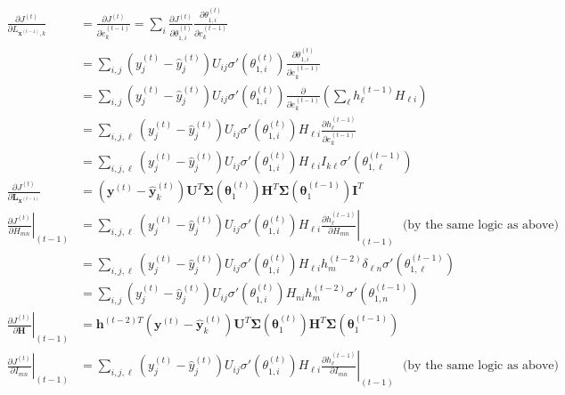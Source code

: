 \documentclass{article}
\begin{document}
\begin{itemize}
    \begin{align*}
        \frac{\partial J^{(t)}}{\partial L_{\mathbf{x}^{(t-1)}, k}} &= \frac{\partial J^{(t)}}{\partial e^{(t-1)}_k} = \sum_i \frac{\partial J^{(t)}}{\partial \theta_{1,i}^{(t)}} \frac{\partial \theta_{1,i}^{(t)}}{\partial e^{(t-1)}_k} \\
        &= \sum_{i,j} (y^{(t)}_j - \hat{y}^{(t)}_j) U_{ij} \sigma'(\theta_{1, i}^{(t)}) \frac{\partial \theta_{1,i}^{(t)}}{\partial e^{(t-1)}_k} \\
        &= \sum_{i,j} (y^{(t)}_j - \hat{y}^{(t)}_j) U_{ij} \sigma'(\theta_{1, i}^{(t)}) \frac{\partial}{\partial e^{(t-1)}_k} (\sum_\ell h^{(t-1)}_\ell H_{\ell i}) \\
        &= \sum_{i,j,\ell} (y^{(t)}_j - \hat{y}^{(t)}_j) U_{ij} \sigma'(\theta_{1, i}^{(t)}) H_{\ell i} \frac{\partial h^{(t-1)}_\ell}{\partial e^{(t-1)}_k} \\
        &= \sum_{i,j,\ell} (y^{(t)}_j - \hat{y}^{(t)}_j) U_{ij} \sigma'(\theta_{1, i}^{(t)}) H_{\ell i} I_{k\ell} \sigma'(\theta^{(t-1)}_{1, \ell}) \\
        \frac{\partial J^{(t)}}{\partial \mathbf{L}_{\mathbf{x}^{(t-1)}}} &= (\mathbf{y}^{(t)}-\hat{\mathbf{y}}^{(t)}_k) \mathbf{U}^T \boldsymbol{\Sigma}(\boldsymbol{\theta}_1^{(t)}) \mathbf{H}^T \boldsymbol{\Sigma}(\boldsymbol{\theta}_1^{(t-1)}) \mathbf{I}^T \\
        \left. \frac{\partial J^{(t)}}{\partial H_{mn}} \right|_{(t-1)} &= \sum_{i,j,\ell} (y^{(t)}_j - \hat{y}^{(t)}_j) U_{ij} \sigma'(\theta_{1, i}^{(t)}) H_{\ell i} \left.\frac{\partial h^{(t-1)}_\ell}{\partial H_{mn}}\right|_{(t-1)} \:\:\:\text{(by the same logic as above)}\\
        &= \sum_{i,j,\ell} (y^{(t)}_j - \hat{y}^{(t)}_j) U_{ij} \sigma'(\theta_{1, i}^{(t)}) H_{\ell i} h^{(t-2)}_m \delta_{\ell n} \sigma'(\theta^{(t-1)}_{1, \ell}) \\
        &= \sum_{i,j} (y^{(t)}_j - \hat{y}^{(t)}_j) U_{ij} \sigma'(\theta_{1, i}^{(t)}) H_{n i} h^{(t-2)}_m \sigma'(\theta^{(t-1)}_{1, n}) \\
        \left. \frac{\partial J^{(t)}}{\partial \mathbf{H}} \right|_{(t-1)} &= \mathbf{h}^{(t-2) T} (\mathbf{y}^{(t)}-\hat{\mathbf{y}}^{(t)}_k) \mathbf{U}^T \boldsymbol{\Sigma}(\boldsymbol{\theta}_1^{(t)}) \mathbf{H}^T \boldsymbol{\Sigma}(\boldsymbol{\theta}_1^{(t-1)}) \\
        \left. \frac{\partial J^{(t)}}{\partial I_{mn}} \right|_{(t-1)} &= \sum_{i,j,\ell} (y^{(t)}_j - \hat{y}^{(t)}_j) U_{ij} \sigma'(\theta_{1, i}^{(t)}) H_{\ell i} \left.\frac{\partial h^{(t-1)}_\ell}{\partial I_{mn}}\right|_{(t-1)} \:\:\:\text{(by the same logic as above)}\\

\end{align*}
\end{itemize}
\end{document}
